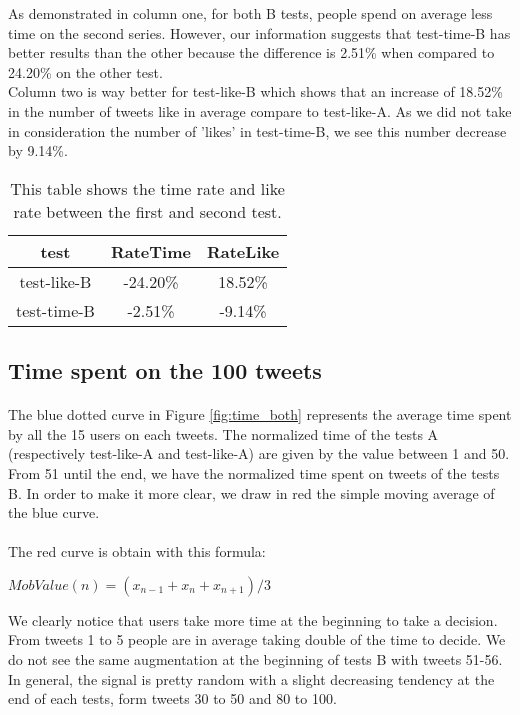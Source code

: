 As demonstrated in column one, for both B tests, people spend on average less time on the second series. However, our information suggests that test-time-B has better results than the other because the difference is 2.51\% when compared to 24.20\% on the other test. \\
Column two is way better for test-like-B which shows that an increase of 18.52\% in the number of tweets like in average compare to test-like-A. As we did not take in consideration the number of 'likes' in test-time-B, we see this number decrease by 9.14\%.

\begin{table}[h]
\centering
\begin{tabular}{ccc}
\toprule
test & RateTime & RateLike \\ 
\midrule
test-like-B & -24.20\% & 18.52\% \\
test-time-B & -2.51\% & -9.14\% \\
\bottomrule 
\end{tabular}
\caption[rate time \& likes]{This table shows the time rate and like rate between the first and second test.}
\label{tab:mo_problem}
\end{table}

\subsection{Time spent on the 100 tweets}

\paragraph{}
The blue dotted curve in Figure \ref{fig:time_both} represents the average time spent by all the 15 users on each tweets. The normalized time of the tests A (respectively test-like-A and test-like-A) are given by the value between 1 and 50. From 51 until the end, we have the normalized time spent on tweets of the tests B.
In order to make it more clear, we draw in red the simple moving average of the blue curve. \\ \\
The red curve is obtain with this formula:

\begin{center}
$MobValue(n)={(x_{n-1}+x_{n}+x_{n+1})}/3$
\end{center}


We clearly notice that users take more time at the beginning to take a decision. From tweets 1 to 5 people are in average taking double of the time to decide. We do not see  the same augmentation at the beginning of tests B with tweets 51-56.\\
In general, the signal is pretty random with a slight decreasing tendency at the end of each tests, form tweets 30 to 50 and 80 to 100.

